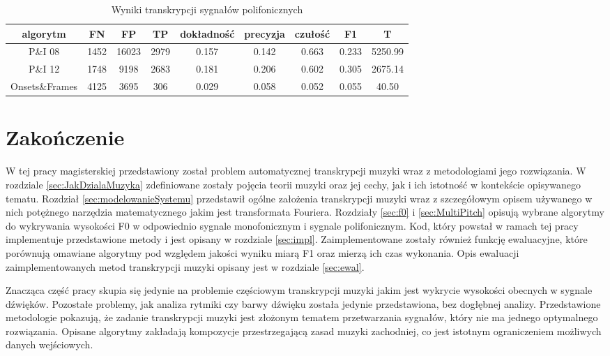 \documentclass[12pt,a4paper,twoside]{mwart}
\begin{document}
\begin{table}[H]
  \begin{center}
      \begin{tabular}{ |c|c|c|c|c|c|c|c|c| } 
      \hline
      algorytm & FN & FP & TP & dokładność & precyzja & czułość & F1 & T\\
      \hline
      P\&I 08 & 1452& 16023& 2979& 0.157 & 0.142 & 0.663 & 0.233 & 5250.99\\
      P\&I 12 & 1748& 9198& 2683& 0.181 & 0.206 & 0.602 & 0.305 & 2675.14\\
      Onsets\&Frames & 4125& 3695& 306& 0.029 & 0.058 & 0.052 & 0.055& 40.50 \\
      \hline
      \end{tabular}
  \end{center}
  \caption{Wyniki transkrypcji sygnałów polifonicznych}
  \label{tab:eval:poli}
\end{table}


\newpage
\setcounter{secnumdepth}{0}
\section{Zakończenie} \label{sec:end}
W tej pracy magisterskiej przedstawiony został problem automatycznej transkrypcji muzyki wraz z metodologiami jego rozwiązania. W rozdziale \ref{sec:JakDzialaMuzyka} zdefiniowane zostały pojęcia teorii muzyki oraz jej cechy, jak i ich istotność w kontekście opisywanego tematu. Rozdział \ref{sec:modelowanieSystemu} przedstawił ogólne założenia transkrypcji muzyki wraz z szczegółowym opisem używanego w nich potężnego narzędzia matematycznego jakim jest transformata Fouriera. Rozdziały \ref{sec:f0} i \ref{sec:MultiPitch} opisują wybrane algorytmy do wykrywania wysokości F0 w odpowiednio sygnale monofonicznym i sygnale polifonicznym. Kod, który powstał w ramach tej pracy implementuje przedstawione metody i jest opisany w rozdziale \ref{sec:impl}. Zaimplementowane zostały również funkcję ewaluacyjne, które porównują omawiane algorytmy pod względem jakości wyniku miarą F1 oraz mierzą ich czas wykonania. Opis ewaluacji zaimplementowanych metod transkrypcji muzyki opisany jest w rozdziale \ref{sec:ewal}.

Znacząca część pracy skupia się jedynie na problemie częściowym transkrypcji muzyki jakim jest wykrycie wysokości obecnych w sygnale dźwięków. Pozostałe problemy, jak analiza rytmiki czy barwy dźwięku została jedynie przedstawiona, bez dogłębnej analizy. Przedstawione metodologie pokazują, że zadanie transkrypcji muzyki jest złożonym tematem przetwarzania sygnałów, który nie ma jednego optymalnego rozwiązania. Opisane algorytmy zakładają kompozycje przestrzegającą zasad muzyki zachodniej, co jest istotnym ograniczeniem możliwych danych wejściowych. 
\end{document}
